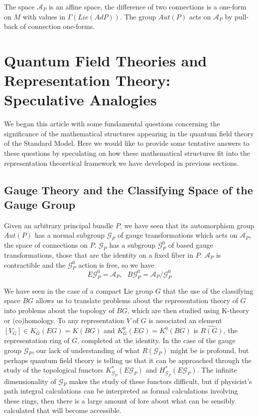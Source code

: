 \documentclass[a4paper,a4paper]{article}
\theoremstyle{conjecture}
\begin{document}
The space ${\mathcal A}_P$ is an affine space, the difference of two connections is a one-form
on $M$ with values in $\Gamma (Lie (Ad P))$.  The group $Aut(P)$ acts on ${\mathcal A}_P$ by
pull-back of connection one-forms.

\section{Quantum Field Theories and Representation Theory: Speculative Analogies}

We began this article with some fundamental questions concerning the significance of the
mathematical structures appearing in the quantum field theory of the Standard Model. Here
we would like to provide some tentative answers to these questions by speculating on
how these mathematical structures fit into the representation theoretical framework
we have developed in previous sections.

\subsection{Gauge Theory and the Classifying Space of the Gauge Group}

Given an arbitrary principal bundle $P$, we have seen that its automorphism group
$Aut(P)$ has a normal subgroup ${\mathcal G}_P$ of gauge transformations which acts
on ${\mathcal A}_P$, the space of connections on $P$.  ${\mathcal G}_P$ has a subgroup
${\mathcal G}^0_P$ of based gauge transformations, those that are the identity on a fixed
fiber in $P$.  ${\mathcal A}_P$ is contractible
and the ${\mathcal G}^0_P$ action is free, so we have
$$E{\mathcal G}^0_P={\mathcal A}_P,\ \ \ B{\mathcal G}^0_P={\mathcal A}_P/{\mathcal G}^0_P$$

We have seen in the case of a compact Lie group $G$ that the use of the classifying
space $BG$ allows us to translate problems about the representation theory of $G$ into
problems about the topology of $BG$, which are then studied using K-theory or (co)homology.
To any representation $V$ of $G$ is associated an element $[V_G]\in K_G(EG)=K(BG)$ and
$K_G^0(EG)=K^0(BG)$ is $\widehat {R(G)}$, the representation ring of $G$, completed at the
identity.  In the case of the gauge group ${\mathcal G}_P$, our lack of understanding of
what $R({\mathcal G}_P)$ might be is profound, but perhaps quantum field theory is telling
us that it can be approached through the study of the topological functors
$K^*_{{\mathcal G}_P}(E{\mathcal G}_P)$ and $H^*_{{\mathcal G}_P}(E{\mathcal G}_P)$.  The infinite 
dimensionality of
${\mathcal G}_P$ makes the study of these functors difficult, but if physicist's path
integral calculations can be interpreted as formal calculations involving these rings,
then there is a large amount of lore about what can be sensibly calculated that will become
accessible.
\end{document}
